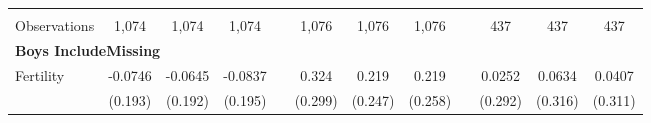 \begin{landscape}
\begin{table}[htpb!]
\begin{center}
\begin{tabular}{lcccp{2mm}cccp{2mm}ccc}
\begin{footnotesize}\end{footnotesize}&\begin{footnotesize}\end{footnotesize}&\begin{footnotesize}\end{footnotesize}&\begin{footnotesize}\end{footnotesize}&\begin{footnotesize}\end{footnotesize}&\begin{footnotesize}\end{footnotesize}&\begin{footnotesize}\end{footnotesize}&\begin{footnotesize}\end{footnotesize}&\begin{footnotesize}\end{footnotesize}&\begin{footnotesize}\end{footnotesize}&\begin{footnotesize}\end{footnotesize}&\begin{footnotesize}\end{footnotesize}\\Observations&1,074&1,074&1,074&&1,076&1,076&1,076&&437&437&437\\
\multicolumn{12}{l}{\textbf{Boys IncludeMissing}}\\ 
Fertility&-0.0746&-0.0645&-0.0837&&0.324&0.219&0.219&&0.0252&0.0634&0.0407\\
&(0.193)&(0.192)&(0.195)&&(0.299)&(0.247)&(0.258)&&(0.292)&(0.316)&(0.311)\\

\end{tabular}
\end{center}
\end{table}
\end{landscape}
